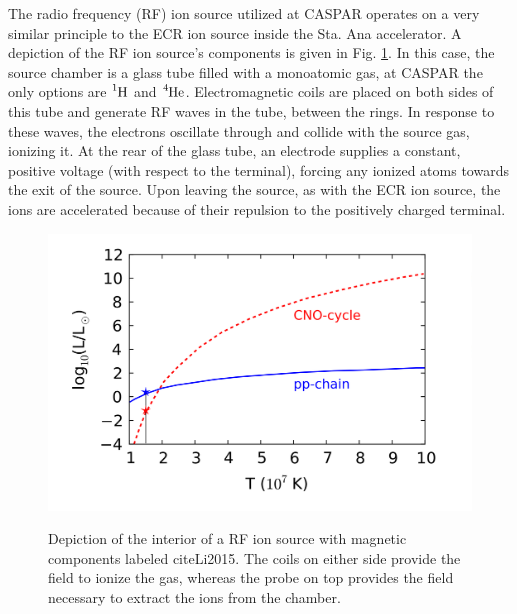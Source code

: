 The radio frequency (RF) ion source utilized at CASPAR operates on a very similar principle to the ECR ion source inside the Sta. Ana accelerator. A depiction of the RF ion source's components is given in Fig. \ref{fig: rfis}. In this case, the source chamber is a glass tube filled with a monoatomic gas, at CASPAR the only options are $\ce{^{1}H}$ and $\ce{^{4}He}$.  Electromagnetic coils are placed on both sides of this tube and generate RF waves in the tube, between the rings. In response to these waves, the electrons oscillate through and collide with the source gas, ionizing it. At the rear of the glass tube, an electrode supplies a constant, positive voltage (with respect to the terminal), forcing any ionized atoms towards the exit of the source. Upon leaving the source, as with the ECR ion source, the ions are accelerated because of their repulsion to the positively charged terminal. 

\begin{figure}
\includegraphics[width=\linewidth]{figures/energyProduction.png}
\label{fig: rfis}
\caption{Depiction of the interior of a RF ion source with magnetic components labeled cite{Li2015}. The coils on either side provide the field to ionize the gas, whereas the probe on top provides the field necessary to extract the ions from the chamber.}
\end{figure}

